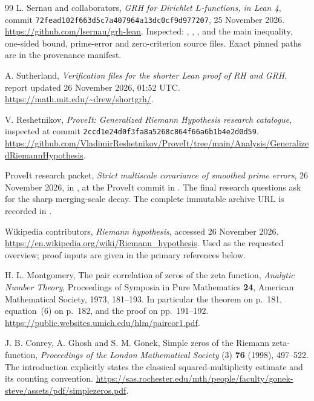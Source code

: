 \documentclass[11pt]{article}
\theoremstyle{definition}\newtheorem{definition}[theorem]{Definition}
\theoremstyle{remark}\newtheorem{remark}[theorem]{Remark}
\begin{document}
\begin{thebibliography}{99}
L. Sernau and collaborators,
\emph{GRH for Dirichlet $L$-functions, in Lean 4},
commit \texttt{72fead102f663d5c7a407964a13dc0cf9d977207},
25 November 2026.
\url{https://github.com/lsernau/grh-lean}.
Inspected: , ,
, and the main inequality, one-sided bound,
prime-error and zero-criterion source files. Exact pinned paths are in
the provenance manifest.

A. Sutherland,
\emph{Verification files for the shorter Lean proof of RH and GRH},
report updated 26 November 2026, 01:52 UTC.
\url{https://math.mit.edu/~drew/shortgrh/}.

V. Reshetnikov, \emph{ProveIt: Generalized Riemann Hypothesis research
catalogue}, inspected at commit
\texttt{2ccd1e24d0f3fa8a5268c864f66a6b1b4e2d0d59}.
\url{https://github.com/VladimirReshetnikov/ProveIt/tree/main/Analysis/GeneralizedRiemannHypothesis}.

ProveIt research packet,
\emph{Strict multiscale covariance of smoothed prime errors},
26 November 2026,  in
,
at the ProveIt commit in \cite{catalogue}. The final research questions
ask for the sharp merging-scale decay. The complete immutable archive
URL is recorded in .

Wikipedia contributors, \emph{Riemann hypothesis}, accessed
26 November 2026.
\url{https://en.wikipedia.org/wiki/Riemann_hypothesis}.
Used as the requested overview; proof inputs are given in the primary
references below.

H. L. Montgomery, The pair correlation of zeros of the zeta function,
\emph{Analytic Number Theory}, Proceedings of Symposia in Pure
Mathematics \textbf{24}, American Mathematical Society, 1973,
181--193. In particular the theorem on p.~181, equation~(6) on p.~182,
and the proof on pp.~191--192.
\url{https://public.websites.umich.edu/hlm/paircor1.pdf}.

J. B. Conrey, A. Ghosh and S. M. Gonek,
Simple zeros of the Riemann zeta-function,
\emph{Proceedings of the London Mathematical Society} (3)
\textbf{76} (1998), 497--522. The introduction explicitly states the
classical squared-multiplicity estimate and its counting convention.
\url{https://sas.rochester.edu/mth/people/faculty/gonek-steve/assets/pdf/simplezeros.pdf}.


\end{thebibliography}
\end{document}

